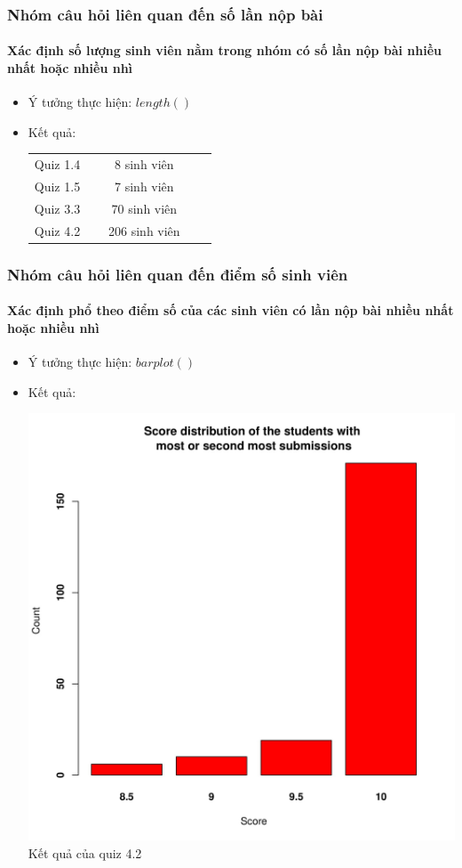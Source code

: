\documentclass[english,10pt,table]{beamer}
\begin{document}
\frame
{
\frametitle{Nhóm câu hỏi liên quan đến số lần nộp bài}
\framesubtitle{Xác định số lượng sinh viên nằm trong nhóm có số lần nộp bài nhiều nhất hoặc nhiều nhì}
\begin{itemize}
    \item Ý tưởng thực hiện: $length()$
    \item Kết quả:\\
    \begin{center}
        \begin{tabular}{l l c c c}
             Quiz 1.4 & $\;$ & 8 sinh viên\\
             Quiz 1.5 & $\;$ & 7 sinh viên\\
             Quiz 3.3 & $\;$ & 70 sinh viên\\
             Quiz 4.2 & $\;$ & 206 sinh viên
        \end{tabular}
    \end{center}
\end{itemize}
}

\frame
{
\frametitle{Nhóm câu hỏi liên quan đến điểm số sinh viên}
\framesubtitle{Xác định phổ theo điểm số của các sinh viên có lần nộp bài nhiều nhất hoặc nhiều nhì}
\begin{itemize}
    \item Ý tưởng thực hiện: $barplot()$
    \item Kết quả:\\
    \begin{center}
        \includegraphics[width = 6 cm]{Images/img3-4-4.png}\\
        Kết quả của quiz 4.2
    \end{center}
\end{itemize}
}
\end{document}

